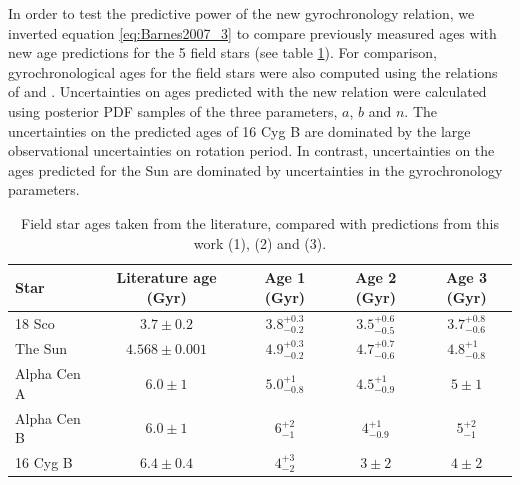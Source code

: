 \documentclass[useAMS, usenatbib]{mn2e}
\begin{document}
In order to test the predictive power of the new gyrochronology relation, we
inverted equation \ref{eq:Barnes2007_3} to compare previously measured ages
with new age predictions for the 5 field stars (see table
\ref{tab:comparison}).
For comparison, gyrochronological ages for the field stars were also computed
using the relations of \citet{Barnes2007} and \citet{Mamajek2008}.
Uncertainties on ages predicted with the new relation were calculated using
posterior PDF samples of the three parameters, $a$, $b$ and $n$.
The uncertainties on the predicted ages of 16 Cyg B are dominated by the large
observational uncertainties on rotation period.
In contrast, uncertainties on the ages predicted for the Sun are dominated by
uncertainties in the gyrochronology parameters.

\begin{table}
\caption{Field star ages taken from the literature, compared with
	predictions from this work (1), \citet{Mamajek2008} (2)
	and \citet{Barnes2007} (3). \label{tab:comparison}}

\begin{tabular}{lcccc}
\hline\hline
{Star} & {Literature age (Gyr)} & {Age 1 (Gyr)} & {Age 2 (Gyr)} & {Age 3 (Gyr)} \\
\hline
18 Sco      & $3.7 \pm 0.2$     & $3.8^{+0.3}_{-0.2}$ & $3.5^{+0.6}_{-0.5}$
	    & $3.7^{+0.8}_{-0.6}$ \\
The Sun     & $4.568 \pm 0.001$ & $4.9^{+0.3}_{-0.2}$ & $4.7^{+0.7}_{-0.6}$
	    & $4.8^{+1}_{-0.8}$ \\
Alpha Cen A & $6.0 \pm 1$       & $5.0^{+1}_{-0.8}$   & $4.5^{+1}_{-0.9}$
	    & $5\pm1$ \\
Alpha Cen B & $6.0 \pm 1$       & $6^{+2}_{-1}$       & $4^{+1}_{-0.9}$
	    & $5^{+2}_{-1}$ \\
16 Cyg B    & $6.4 \pm 0.4$     & $4^{+3}_{-2}$       & $3\pm2$
	    & $4\pm2$ \\
\hline
\end{tabular}
\end{table}
\end{document}
